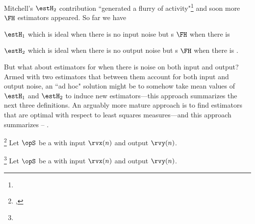 Mitchell's $\estH_2$ contribution ``generated a flurry of activity"\footnote{}
and soon more $\FH$ estimators appeared. 
So far we have 
\begin{listi}
  \item $\estH_1$ which is ideal when there is no input noise but 
        s $\FH$ when there is 
  \item $\estH_2$ which is ideal when there is no output noise but
        s $\FH$ when there is .
\end{listi}
But what about estimators for when there is noise on both input and output?
Armed with two estimators that between them account for both input and output noise,
an ``ad hoc" solution might be to somehow take mean values of $\estH_1$ and $\estH_2$ 
to induce new estimators---this approach summarizes the next three definitions.
An arguably more mature approach is to find estimators that are optimal with respect to least squares measures---and
this approach summarizes  -- .

\begin{definition}
\footnote{
  ,
  }
\label{def:Havg}
Let $\opS$ be a  with input $\rvx(n)$ and output $\rvy(n)$.
\end{definition}

\begin{definition}
\footnote{
  }
\label{def:Hgm}
Let $\opS$ be a  with input $\rvx(n)$ and output $\rvy(n)$.
\end{definition}

